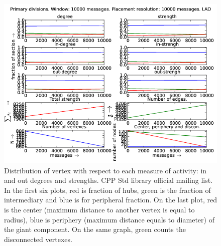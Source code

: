 \documentclass[%
 aip,
 jmp,%
 amsmath,amssymb,
 reprint,%
]{revtex4-1}
\begin{document}
\begin{figure}[hbtp] 
   \centering
        \includegraphics[width=\textwidth]{figs/LAD/10000}
    \caption{Distribution of vertex with respect to each measure of activity: in and out degrees and strengths. CPP Std library official mailing list. In the first six plots, red is fraction of hubs, green is the fraction of intermediary and blue is for peripheral fraction. On the last plot, red is the center (maximum distance to another vertex is equal to radius), blue is periphery (maximum distance equals to diameter) of the giant component. On the same graph, green counts the disconnected vertexes.}
    \label{fig:lad10000}
\end{figure}
\end{document}
